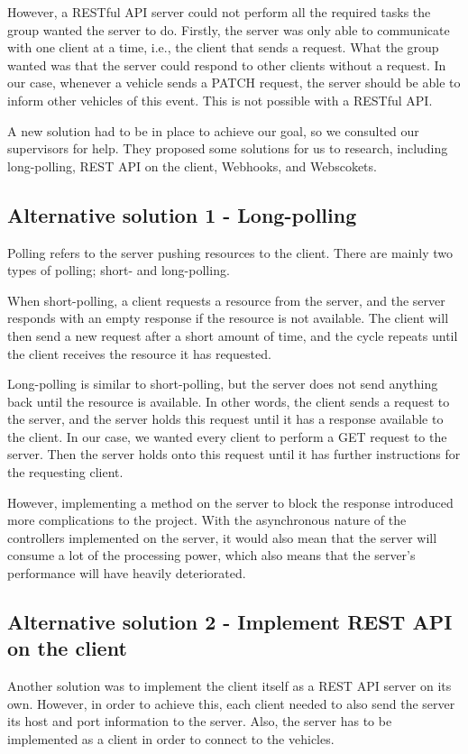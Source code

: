 However, a RESTful API server could not perform all the required tasks the group wanted the server to do. Firstly, the server was only able to communicate with one client at a time, i.e., the client that sends a request. What the group wanted was that the server could respond to other clients without a request. In our case, whenever a vehicle sends a PATCH request, the server should be able to inform other vehicles of this event. This is not possible with a RESTful API.

A new solution had to be in place to achieve our goal, so we consulted our supervisors for help. They proposed some solutions for us to research, including long-polling, REST API on the client, Webhooks, and Webscokets. 

\subsection{Alternative solution 1 - Long-polling}
Polling refers to the server pushing resources to the client. There are mainly two types of polling; short- and long-polling. 

When short-polling, a client requests a resource from the server, and the server responds with an empty response if the resource is not available. The client will then send a new request after a short amount of time, and the cycle repeats until the client receives the resource it has requested.

Long-polling is similar to short-polling, but the server does not send anything back until the resource is available. In other words, the client sends a request to the server, and the server holds this request until it has a response available to the client. In our case, we wanted every client to perform a GET request to the server. Then the server holds onto this request until it has further instructions for the requesting client.

However, implementing a method on the server to block the response introduced more complications to the project. With the asynchronous nature of the controllers implemented on the server, it would also mean that the server will consume a lot of the processing power, which also means that the server's performance will have heavily deteriorated.

\subsection{Alternative solution 2 - Implement REST API on the client}
Another solution was to implement the client itself as a REST API server on its own. However, in order to achieve this, each client needed to also send the server its host and port information to the server. Also, the server has to be implemented as a client in order to connect to the vehicles.

